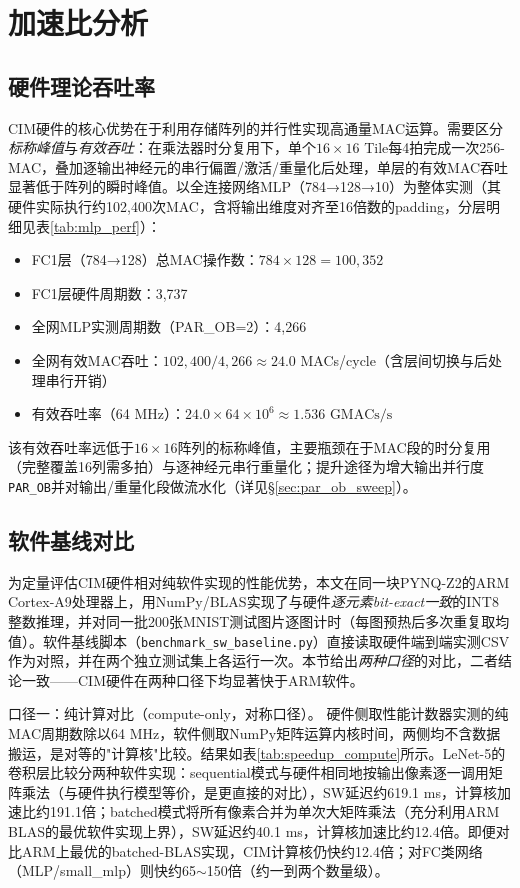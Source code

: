 \documentclass[bachelor,compact,nofont]{xjtuthesis}
\numberwithin{equation}{chapter}
\begin{document}
\section{加速比分析}

\subsection{硬件理论吞吐率}
\label{sec:hw_throughput}

CIM硬件的核心优势在于利用存储阵列的并行性实现高通量MAC运算。需要区分\emph{标称峰值}与\emph{有效吞吐}：在乘法器时分复用下，单个$16\times16$ Tile每4拍完成一次256-MAC，叠加逐输出神经元的串行偏置/激活/重量化后处理，单层的有效MAC吞吐显著低于阵列的瞬时峰值。以全连接网络MLP（784→128→10）为整体实测（其硬件实际执行约102,400次MAC，含将输出维度对齐至16倍数的padding，分层明细见表\ref{tab:mlp_perf}）：

\begin{itemize}
	\item FC1层（784→128）总MAC操作数：$784 \times 128 = 100{,}352$
	\item FC1层硬件周期数：3,737
	\item 全网MLP实测周期数（PAR\_OB=2）：4,266
	\item 全网有效MAC吞吐：$102{,}400 / 4{,}266 \approx 24.0$ MACs/cycle（含层间切换与后处理串行开销）
	\item 有效吞吐率（64 MHz）：$24.0 \times 64 \times 10^6 \approx 1.536 \text{ GMACs/s}$
\end{itemize}

\noindent 该有效吞吐率远低于$16\times16$阵列的标称峰值，主要瓶颈在于MAC段的时分复用（完整覆盖16列需多拍）与逐神经元串行重量化；提升途径为增大输出并行度\texttt{PAR\_OB}并对输出/重量化段做流水化（详见§\ref{sec:par_ob_sweep}）。

\subsection{软件基线对比}
\label{sec:sw_baseline}

为定量评估CIM硬件相对纯软件实现的性能优势，本文在同一块PYNQ-Z2的ARM Cortex-A9处理器上，用NumPy/BLAS实现了与硬件\emph{逐元素bit-exact一致}的INT8整数推理，并对同一批200张MNIST测试图片逐图计时（每图预热后多次重复取均值）。软件基线脚本（\texttt{benchmark\_sw\_baseline.py}）直接读取硬件端到端实测CSV作为对照，并在两个独立测试集上各运行一次。本节给出\emph{两种口径}的对比，二者结论一致——CIM硬件在两种口径下均显著快于ARM软件。

口径一：纯计算对比（compute-only，对称口径）。 硬件侧取性能计数器实测的纯MAC周期数除以64 MHz，软件侧取NumPy矩阵运算内核时间，两侧均不含数据搬运，是对等的"计算核"比较。结果如表\ref{tab:speedup_compute}所示。LeNet-5的卷积层比较分两种软件实现：sequential模式与硬件相同地按输出像素逐一调用矩阵乘法（与硬件执行模型等价，是更直接的对比），SW延迟约619.1 ms，计算核加速比约191.1倍；batched模式将所有像素合并为单次大矩阵乘法（充分利用ARM BLAS的最优软件实现上界），SW延迟约40.1 ms，计算核加速比约12.4倍。即便对比ARM上最优的batched-BLAS实现，CIM计算核仍快约12.4倍；对FC类网络（MLP/small\_mlp）则快约65$\sim$150倍（约一到两个数量级）。
\end{document}

